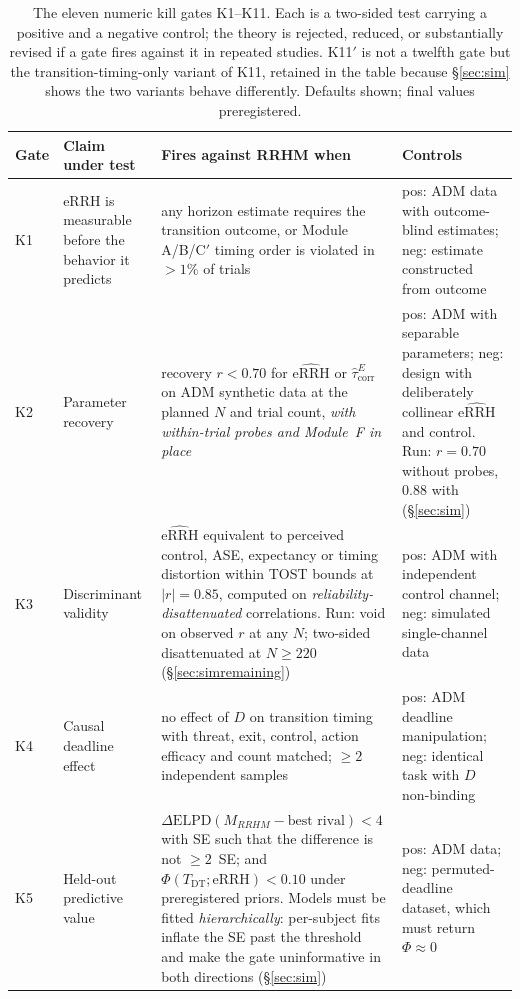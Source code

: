 \documentclass[9pt,twocolumn]{article}
\newcommand{\eRRH}{\mathrm{eRRH}}
\newcommand{\eRRHhat}{\widehat{\mathrm{eRRH}}}
\newcommand{\Tdt}{T_{\mathrm{DT}}}
\newcommand{\tcorr}{\widehat{\tau}^{E}_{\mathrm{corr}}}
\begin{document}
\begin{table}[!t]
\centering
\caption{The eleven numeric kill gates K1--K11. Each is a two-sided test carrying a positive and a negative control; the theory is rejected, reduced, or substantially revised if a gate fires against it in repeated studies. K11$'$ is not a twelfth gate but the transition-timing-only variant of K11, retained in the table because \S\ref{sec:sim} shows the two variants behave differently. Defaults shown; final values preregistered.}
\label{tab:gates}
\small
\begin{tabularx}{\textwidth}{p{}p{}X p{}}
\toprule
\textbf{Gate} & \textbf{Claim under test} & \textbf{Fires against RRHM when} & \textbf{Controls} \\
\midrule
K1 & eRRH is measurable before the behavior it predicts & any horizon estimate requires the transition outcome, or Module A/B/C$'$ timing order is violated in $>1\%$ of trials & pos: ADM data with outcome-blind estimates; neg: estimate constructed from outcome \\
K2 & Parameter recovery & recovery $r<0.70$ for $\eRRHhat$ or $\tcorr$ on ADM synthetic data at the planned $N$ and trial count, \emph{with within-trial probes and Module~F in place} & pos: ADM with separable parameters; neg: design with deliberately collinear $\eRRHhat$ and control. Run: $r=0.70$ without probes, $0.88$ with (\S\ref{sec:sim}) \\
K3 & Discriminant validity & $\eRRHhat$ equivalent to perceived control, ASE, expectancy or timing distortion within TOST bounds at $|r|=0.85$, computed on \emph{reliability-disattenuated} correlations. Run: void on observed $r$ at any $N$; two-sided disattenuated at $N\ge220$ (\S\ref{sec:simremaining}) & pos: ADM with independent control channel; neg: simulated single-channel data \\
K4 & Causal deadline effect & no effect of $D$ on transition timing with threat, exit, control, action efficacy and count matched; $\ge2$ independent samples & pos: ADM deadline manipulation; neg: identical task with $D$ non-binding \\
K5 & Held-out predictive value & $\Delta\mathrm{ELPD}(M_{RRHM}-\text{best rival})<4$ with SE such that the difference is not $\ge2$~SE; and $\Phi(\Tdt;\eRRH)<0.10$ under preregistered priors. Models must be fitted \emph{hierarchically}: per-subject fits inflate the SE past the threshold and make the gate uninformative in both directions (\S\ref{sec:sim}) & pos: ADM data; neg: permuted-deadline dataset, which must return $\Phi\approx0$ \\

\end{tabularx}
\end{table}
\end{document}
